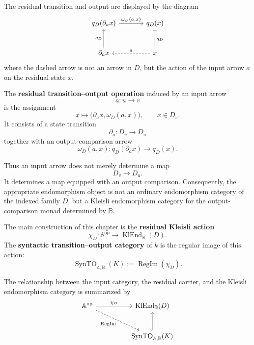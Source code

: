 The residual transition and output are displayed by the diagram
\[
\begin{tikzcd}[column sep=large, row sep=large]
    q_D(\partial_a x)
        \arrow[r, "{\omega_D(a,x)}"]
    &
    q_D(x)
    \\
    \partial_a x
        \arrow[u, "q_D"]
    &
    x
        \arrow[l, dashed, "{a}"']
        \arrow[u, "q_D"']
\end{tikzcd}
\]
where the dashed arrow is not an arrow in \(D\), but the action of the input
arrow \(a\) on the residual state \(x\).

\begin{definition}
\label{def:syn-to-residual-transition-output-operation}
    The \textbf{residual transition--output operation} induced by an input
    arrow
    \[
        a:u\to v
    \]
    is the assignment
    \[
        x\longmapsto
        \bigl(\partial_a x,\omega_D(a,x)\bigr),
        \qquad
        x\in D_v.
    \]
    It consists of a state transition
    \[
        \partial_a:D_v\to D_u
    \]
    together with an output-comparison arrow
    \[
        \omega_D(a,x):q_D(\partial_a x)\to q_D(x).
    \]
\end{definition}

Thus an input arrow does not merely determine a map
\[
    D_v\to D_u.
\]
It determines a map equipped with an output comparison. Consequently, the
appropriate endomorphism object is not an ordinary endomorphism category of the
indexed family \(D\), but a Kleisli endomorphism category for the
output-comparison monad determined by \(\mathbb B\).

The main construction of this chapter is the \textbf{residual Kleisli action}
\[
    \chi_D:
    \mathbb A^{\mathrm{op}}
    \longrightarrow
    \operatorname{KlEnd}_{\mathbb B}(D).
\]
The \textbf{syntactic transition--output category} of \(k\) is the regular
image of this action:
\[
    \operatorname{SynTO}_{\mathbb A,\mathbb B}(K)
    :=
    \operatorname{RegIm}(\chi_D).
\]

The relationship between the input category, the residual carrier, and the
Kleisli endomorphism category is summarized by
\[
\begin{tikzcd}[column sep=huge, row sep=large]
    \mathbb A^{\mathrm{op}}
        \arrow[r, "{\chi_D}"]
        \arrow[dr, dashed, "\operatorname{RegIm}"']
    &
    \operatorname{KlEnd}_{\mathbb B}(D)
    \\
    &
    \operatorname{SynTO}_{\mathbb A,\mathbb B}(K)
        \arrow[u, hook]
\end{tikzcd}
\]

